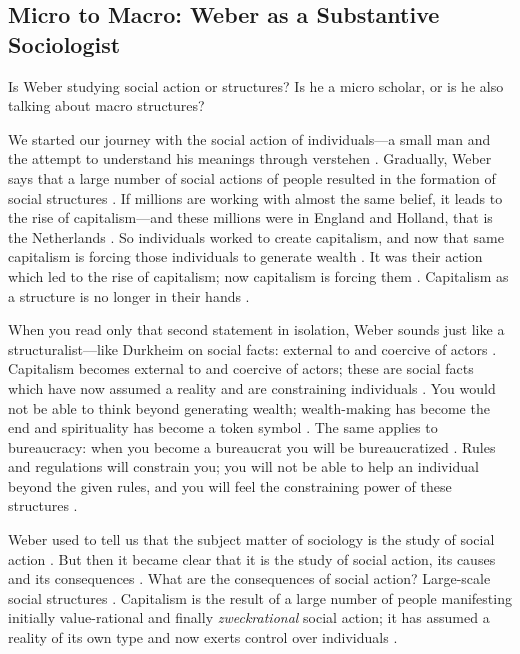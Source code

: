 \subsection{Micro to Macro: Weber as a Substantive Sociologist}
Is Weber studying social action or structures? Is he a micro scholar, or is he also talking about macro structures? 

We started our journey with the social action of individuals---a small man and the attempt to understand his meanings through verstehen .
Gradually, Weber says that a large number of social actions of people resulted in the formation of social structures . If millions are working with almost the same belief, it leads to the rise of capitalism---and these millions were in England and Holland, that is the Netherlands .
So individuals worked to create capitalism, and now that same capitalism is forcing those individuals to generate wealth . It was their action which led to the rise of capitalism; now capitalism is forcing them . Capitalism as a structure is no longer in their hands .

\begin{CriticalPoint}
When you read only that second statement in isolation, Weber sounds just like a structuralist---like Durkheim on social facts: external to and coercive of actors .
Capitalism becomes external to and coercive of actors; these are social facts which have now assumed a reality and are constraining individuals . You would not be able to think beyond generating wealth; wealth-making has become the end and spirituality has become a token symbol .
The same applies to bureaucracy: when you become a bureaucrat you will be bureaucratized . Rules and regulations will constrain you; you will not be able to help an individual beyond the given rules, and you will feel the constraining power of these structures .
\end{CriticalPoint}

\begin{KeyConcept}
Weber used to tell us that the subject matter of sociology is the study of social action . But then it became clear that it is the study of social action, its causes and its consequences .
What are the consequences of social action? Large-scale social structures . Capitalism is the result of a large number of people manifesting initially value-rational and finally \textit{zweckrational} social action; it has assumed a reality of its own type and now exerts control over individuals .
\end{KeyConcept}

